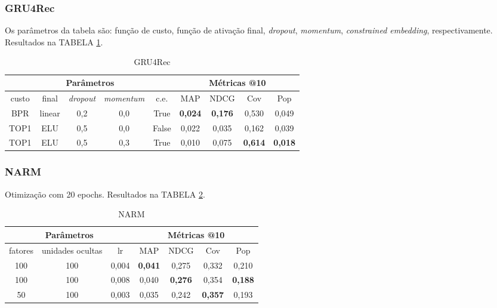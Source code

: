 \subsubsection{GRU4Rec}

Os parâmetros da tabela são: função de custo, função de ativação final,
\textit{dropout}, \textit{momentum}, \textit{constrained embedding}, respectivamente.
Resultados na TABELA \ref{opt:GRU4Rec_rem}.

\begin{table}[htbp]
  \centering
  \begin{tabular}{|c|c|c|c|c|c|c|c|c|}
    \hline
      \multicolumn{5}{|c|}{Parâmetros} & \multicolumn{4}{c|}{Métricas @10} \\
      \hline
      custo & final & \textit{dropout} & \textit{momentum} & c.e. & MAP & NDCG & Cov & Pop \\
      \hline
      BPR & linear & 0,2 & 0,0 & True & \textbf{0,024} & \textbf{0,176} & 0,530 & 0,049 \\
      \hline
      TOP1 & ELU & 0,5 & 0,0 & False & 0,022 & 0,035 & 0,162 & 0,039 \\
      \hline
      TOP1 & ELU & 0,5 & 0,3 & True & 0,010 & 0,075 & \textbf{0,614} & \textbf{0,018} \\
      \hline
\end{tabular}
      \caption{GRU4Rec}
      \label{opt:GRU4Rec_rem}
\end{table}

\subsubsection{NARM}
Otimização com 20 epochs. Resultados na TABELA \ref{opt:NARM_rem}.

\begin{table}[htbp]
  \centering
  \begin{tabular}{|c|c|c|c|c|c|c|}
    \hline
      \multicolumn{3}{|c|}{Parâmetros} & \multicolumn{4}{c|}{Métricas @10} \\
      \hline
      fatores & unidades ocultas & lr & MAP & NDCG & Cov & Pop \\
      \hline
      100 & 100 & 0,004 & \textbf{0,041} & 0,275 & 0,332 & 0,210 \\
      \hline
      100 & 100 & 0,008 & 0,040 & \textbf{0,276} & 0,354 & \textbf{0,188} \\
      \hline
      50 & 100 & 0,003 & 0,035 & 0,242 & \textbf{0,357} & 0,193 \\
      \hline
\end{tabular}
      \caption{NARM}
      \label{opt:NARM_rem}
\end{table}

